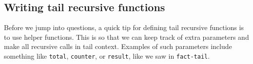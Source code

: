 \subsection*{Writing tail recursive functions}

Before we jump into questions, a quick tip for defining tail recursive functions
is to use helper functions. This is so that we can keep track of extra parameters
and make all recursive calls in tail context. Examples of such parameters include
something like \texttt{total}, \texttt{counter}, or \texttt{result}, like we saw
in \texttt{fact-tail}.
